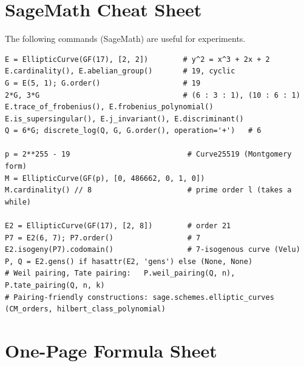 \documentclass[11pt,a4paper,oneside]{book}
\theoremstyle{plain}
\theoremstyle{definition}
\theoremstyle{remark}
\begin{document}
\chapter{SageMath Cheat Sheet}\label{app:sage}

The following commands (SageMath) are useful for experiments.
\begin{lstlisting}[style=plain]
E = EllipticCurve(GF(17), [2, 2])        # y^2 = x^3 + 2x + 2
E.cardinality(), E.abelian_group()       # 19, cyclic
G = E(5, 1); G.order()                   # 19
2*G, 3*G                                 # (6 : 3 : 1), (10 : 6 : 1)
E.trace_of_frobenius(), E.frobenius_polynomial()
E.is_supersingular(), E.j_invariant(), E.discriminant()
Q = 6*G; discrete_log(Q, G, G.order(), operation='+')   # 6

p = 2**255 - 19                           # Curve25519 (Montgomery form)
M = EllipticCurve(GF(p), [0, 486662, 0, 1, 0])
M.cardinality() // 8                      # prime order l (takes a while)

E2 = EllipticCurve(GF(17), [2, 8])        # order 21
P7 = E2(6, 7); P7.order()                 # 7
E2.isogeny(P7).codomain()                 # 7-isogenous curve (Velu)
P, Q = E2.gens() if hasattr(E2, 'gens') else (None, None)
# Weil pairing, Tate pairing:   P.weil_pairing(Q, n),  P.tate_pairing(Q, n, k)
# Pairing-friendly constructions: sage.schemes.elliptic_curves (CM_orders, hilbert_class_polynomial)
\end{lstlisting}

\chapter{One-Page Formula Sheet}
\end{document}
